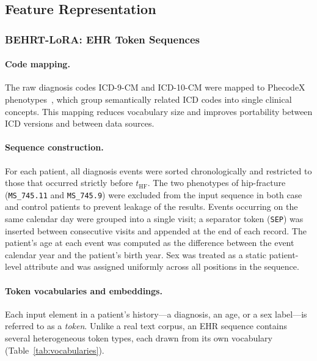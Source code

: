 \documentclass[12pt]{article}
\begin{document}
\subsection{Feature Representation}

\subsubsection{BEHRT-LoRA: EHR Token Sequences}

\paragraph{Code mapping.}
The raw diagnosis codes ICD-9-CM and ICD-10-CM were mapped to PhecodeX phenotypes~\citep{Shuey2023PhecodeX}, which group semantically related ICD codes into single clinical concepts. This mapping reduces vocabulary size and improves portability between ICD versions and between data sources.

\paragraph{Sequence construction.}
For each patient, all diagnosis events were sorted chronologically and restricted to those that occurred strictly before $t_{\mathrm{HF}}$. The two phenotypes of hip-fracture (\texttt{MS\_745.11} and \texttt{MS\_745.9}) were excluded from the input sequence in both case and control patients to prevent leakage of the results. Events occurring on the same calendar day were grouped into a single visit; a separator token (\texttt{SEP}) was inserted between consecutive visits and appended at the end of each record. The patient's age at each event was computed as the difference between the event calendar year and the patient's birth year. Sex was treated as a static patient-level attribute and was assigned uniformly across all positions in the sequence.

\paragraph{Token vocabularies and embeddings.}
Each input element in a patient's history---a diagnosis, an age, or a sex label---is referred to as a \textit{token}. Unlike a real text corpus, an EHR sequence contains several heterogeneous token types, each drawn from its own vocabulary (Table~\ref{tab:vocabularies}).
\end{document}
